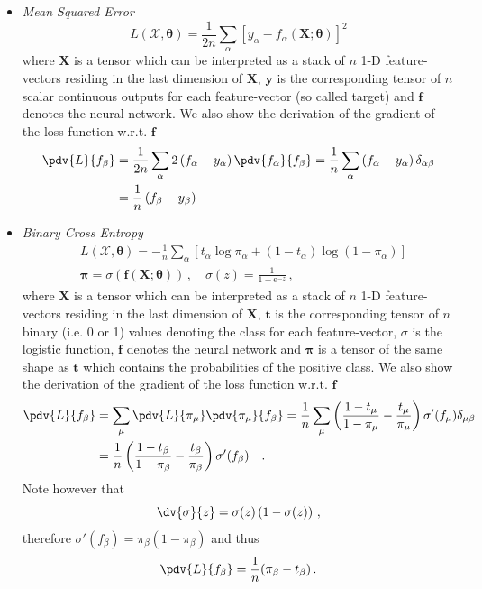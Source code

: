 \documentclass[a5paper]{article}
\newcommand{\e}{\mathrm{e}}
\newcommand{\mc}[1]{\mathcal{#1}}
\begin{document}
\begin{itemize}
   \item \emph{Mean Squared Error}
   \[
   L(\mc{X}, \bm{\theta}) = \frac{1}{2n} \sum_\alpha \left[ y_\alpha - f_\alpha(\bm{X};\bm{\theta}) \right]^2
   \] 
   where \(\bm{X}\) is a tensor which can be interpreted as a stack of \(n\) 1-D feature-vectors
   residing in the last dimension of \(\bm{X}\), \(\bm{y}\) is the corresponding tensor of \(n\)
   scalar continuous outputs for each feature-vector (so called target) and \(\bm{f}\) denotes the
   neural network. We also show the derivation of the gradient of the loss function w.r.t.
   \(\bm{f}\)
   \[
   \begin{split}
   \pdv{L}{f_\beta} &= \frac{1}{2n} \sum_\alpha 2 \left( f_\alpha - y_\alpha \right) \pdv{f_\alpha}{f_\beta} = \frac{1}{n} \sum_\alpha \left( f_\alpha - y_\alpha \right) \delta_{\alpha\beta}\\
                       &= \frac{1}{n} \left( f_\beta - y_\beta \right)
   \end{split}
   \]

   \item \emph{Binary Cross Entropy}
   \[
   \begin{split} 
      & L(\mc{X}, \bm{\theta}) = -\frac{1}{n} \sum_{\alpha} \left[ t_\alpha \log\pi_\alpha + (1-t_\alpha)\log(1-\pi_\alpha) \right] \\
      & \bm{\pi} = \sigma\left( \bm{f}(\bm{X}; \bm{\theta})\right)\,,\quad \sigma(z) = \frac{1}{1 + \e^{-z}}\,,
   \end{split}
   \] 
   where \(\bm{X}\) is a tensor which can be interpreted as a stack of \(n\) 1-D feature-vectors
   residing in the last dimension of \(\bm{X}\), \(\bm{t}\) is the corresponding tensor of \(n\)
   binary (i.e. 0 or 1) values denoting the class for each feature-vector, \(\sigma\) is the
   logistic function, \(\bm{f}\) denotes the neural network and \(\bm{\pi}\) is a tensor of the same
   shape as \(\bm{t}\) which contains the probabilities of the positive class. We also show the
   derivation of the gradient of the loss function w.r.t. \(\bm{f}\)
   \[
   \begin{split}
      \pdv{L}{f_\beta} &= \sum_{\mu} \pdv{L}{\pi_{\mu}} \pdv{\pi_{\mu}}{f_\beta} = \frac{1}{n}\sum_{\mu} \left( \frac{1-t_\mu}{1 - \pi_\mu} - \frac{t_{\mu}}{\pi_{\mu}} \right) \sigma'(f_\mu) \delta_{\mu\beta} \\
                        &= \frac{1}{n} \left( \frac{1-t_\beta}{1 - \pi_\beta} - \frac{t_{\beta}}{\pi_{\beta}}\right) \sigma'(f_\beta)\quad.
   \end{split}
   \]
   Note however that
   \[
      \dv{\sigma}{z} = \sigma(z)\left(1 - \sigma(z)\right)\,,
   \]
   therefore \(\sigma'(f_\beta) = \pi_\beta (1 - \pi_\beta)\) and thus
   \[
   \pdv{L}{f_\beta} = \frac{1}{n}(\pi_\beta - t_\beta)\,.
   \]


\end{itemize}
\end{document}
